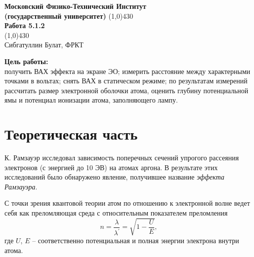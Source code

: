 \documentclass[a4paper,12pt]{article} %
\begin{document}
\begin{titlepage}

\begin{center}
\large\textbf{Московский Физико-Технический Институт}\\
\large\textbf{(государственный университет)}
\vfill
\line(1,0){430}\\[1mm]
\huge\textbf{Работа 5.1.2}\\
\line(1,0){430}\\[1mm]
\vfill
\large Сибгатуллин Булат, ФРКТ\\
\end{center}

\end{titlepage}
\noindent \textbf{Цель работы: } \\
\indent получить ВАХ эффекта на экране ЭО; измерить расстояние между характерными точками в вольтах; снять ВАХ в статическом режиме; по результатам измерений рассчитать размер электронной оболочки атома, оценить глубину потенциальной ямы и потенциал ионизации атома, заполняющего лампу.

\section{Теоретическая часть}
	К. Рамзауэр исследовал зависимость поперечных сечений упрогого рассеяния электронов (с энергией до 10 ЭВ) на атомах аргона. В результате этих исследований было обнаружено явление, получившее название \textit{эффекта Рамзауэра}.
	
	С точки зрения квантовой теории атом по отношению к электронной волне ведет себя как преломляющая среда с относительным показателем преломления
	\begin{equation*}
		n = \frac{\lambda}{\lambda^\prime} = \sqrt{1-\frac{U}{E}},
	\end{equation*}
	где $U$, $E$ -- соответственно потенциальная и полная энергии электрона внутри атома.
	
\end{document}
